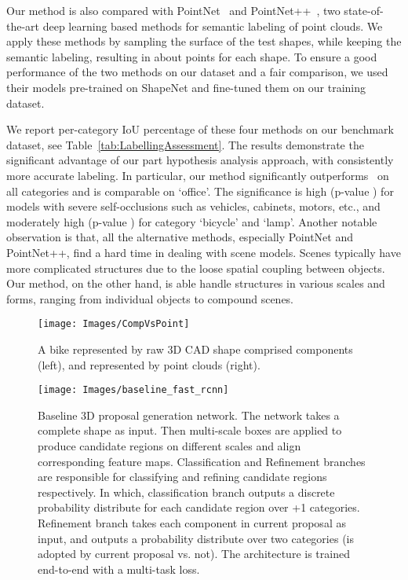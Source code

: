 \documentclass[acmtog]{acmart}
\newcommand{\new}[1]{{\color{black}#1}}
\newcommand{\wxg}[1]{{\color{black}#1}}
\newcommand{\wang}[1]{{\color{black}#1}}
\begin{document}
{\wang{
Our method is also compared with PointNet~\cite{Su_CVPR17} and PointNet++~\cite{qi_2017},
two state-of-the-art deep learning based methods for semantic labeling of point clouds.
We apply these methods by sampling the surface of the test shapes,
while keeping the semantic labeling, resulting in about  points for each shape.
To ensure a good performance of the two methods on our dataset and a fair comparison, we used their models pre-trained on ShapeNet and fine-tuned them on our training dataset.
}

We report per-category IoU percentage of these \wang{four} methods on our benchmark dataset, see Table~\ref{tab:LabellingAssessment}.
The results demonstrate the significant advantage of our part hypothesis analysis approach,
with consistently more accurate labeling.
In particular, our method significantly outperforms~\cite{Yi_SG17} on all categories and is comparable on `office'.
The significance is high (p-value ) for models with severe self-occlusions such as
vehicles, cabinets, motors, etc., and moderately high (p-value ) for category `bicycle' and `lamp'.
Another notable observation is that, all the alternative methods, especially PointNet \wang{and PointNet++},
find a hard time in dealing with scene models.
Scenes typically have more complicated structures due to the loose spatial coupling between objects.
Our method, on the other hand, is able handle structures in various scales and forms, ranging
from individual objects to compound scenes.
}





\begin{figure}[!t]
  \centering
  \texttt{[image: Images/CompVsPoint]}
  \caption{\new{A bike represented by raw 3D CAD shape comprised  components (left), and represented by  point clouds (right).}}
  \label{fig:CompVsPoint}
\end{figure}
\fi






\begin{figure*}[ht]
  \centering
  \texttt{[image: Images/baseline\_fast\_rcnn]}
  \caption{\wxg{Baseline 3D proposal generation network. The network takes a complete shape as input.
Then multi-scale boxes are applied to produce candidate regions on different scales and align corresponding feature maps.
Classification and Refinement branches are responsible for classifying and refining candidate regions respectively.
In which, classification branch outputs a discrete probability distribute for each candidate region over +1 categories.
Refinement branch takes each component in current proposal as input,
and outputs a probability distribute over two categories (is adopted by current proposal vs. not).
The architecture is trained end-to-end with a multi-task loss.}}
  \label{fig:base_fast_rcnn}
\end{figure*}
\fi
\end{document}
